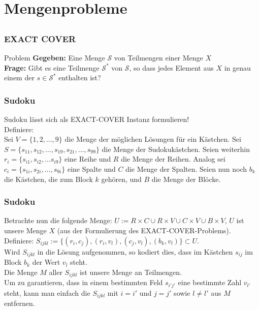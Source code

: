 \section{Mengenprobleme}
\subsection{}

\begin{frame}
\frametitle{EXACT COVER}
\begin{block}{Problem}
\textbf{Gegeben:} Eine Menge $\mathcal{S}$ von Teilmengen einer Menge $X$\\
\textbf{Frage:} Gibt es eine Teilmenge $\mathcal{S}^*$ von $\mathcal{S}$, so dass jedes Element aus $X$ in genau einem der $s \in \mathcal{S}^*$ enthalten ist?
\end{block}
\end{frame}

\begin{frame}
\frametitle{Sudoku}
Sudoku lässt sich als EXACT-COVER Instanz formulieren!\\
Definiere:\\
Sei $V = \{1,2,\ldots,9\}$ die Menge der möglichen Lösungen für ein Kästchen.
Sei $S = \{s_{11}, s_{12},\ldots,s_{19},s_{21},\ldots,s_{99}\}$ die Menge der Sudokukästchen.
Seien weiterhin $r_i = \{s_{i1}, s_{i2}, \ldots s_{i9}\}$ eine Reihe und $R$ die Menge der Reihen.
Analog sei $c_i = \{s_{1i}, s_{2i}, \ldots, s_{9i}\}$ eine Spalte und $C$ die Menge der Spalten.
Seien nun noch $b_k$ die Kästchen, die zum Block $k$ gehören, und $B$ die Menge der Blöcke.
\end{frame}

\begin{frame}
\frametitle{Sudoku}
Betrachte nun die folgende Menge: $U := R \times C \cup R \times V \cup C \times V \cup B \times V$, $U$ ist unsere Menge $X$ (aus der Formulierung des EXACT-COVER-Problems).\\
Definiere: $S_{ijkl} := \{(r_i,c_j),(r_i,v_l),(c_j,v_l),(b_k,v_l)\} \subset U$.\\[8pt]
Wird $S_{ijkl}$ in die Lösung aufgenommen, so kodiert dies, dass im Kästchen $s_{ij}$ im Block $b_k$ der Wert $v_l$ steht.\\
Die Menge $M$ aller $S_{ijkl}$ ist unsere Menge an Teilmengen.\\
Um zu garantieren, dass in einem bestimmten Feld $s_{i'j'}$ eine bestimmte Zahl $v_{l'}$ steht, kann man einfach die $S_{ijkl}$ mit $i = i'$ und $j = j'$ sowie $l \neq l'$ aus $M$ entfernen.
\end{frame}

